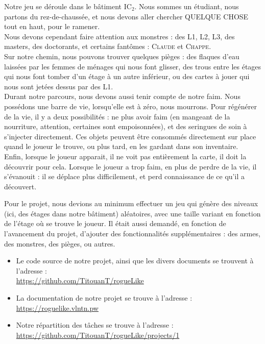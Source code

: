 \documentclass[11pt]{report}
\begin{document}
	Notre jeu se déroule dans le bâtiment IC$_2$. Nous sommes un étudiant, nous partons du rez-de-chaussée, et nous devons aller chercher QUELQUE CHOSE tout en haut, pour le ramener. \\
	Nous devons cependant faire attention aux monstres : des L1, L2, L3, des masters, des doctorants, et certains fantômes : \textsc{Claude} et \textsc{Chappe}.\\
	Sur notre chemin, nous pouvons trouver quelques pièges : des flaques d'eau laissées par les femmes de ménages qui nous font glisser, des trous entre les étages qui nous font tomber d'un étage à un autre inférieur, ou des cartes à jouer qui nous sont jetées dessus par des L1.\\
	Durant notre parcours, nous devons aussi tenir compte de notre faim. Nous possédons une barre de vie, lorsqu'elle est à zéro, nous mourrons. Pour régénérer de la vie, il y a deux possibilités : ne plus avoir faim (en mangeant de la nourriture, attention, certaines sont empoisonnées), et des seringues de soin à s'injecter directement. Ces objets peuvent être consommés directement sur place quand le joueur le trouve, ou plus tard, en les gardant dans son inventaire.\\
	Enfin, lorsque le joueur apparait, il ne voit pas entièrement la carte, il doit la découvrir pour cela. Lorsque le joueur a trop faim, en plus de perdre de la vie, il s'évanouit : il se déplace plus difficilement, et perd connaissance de ce qu'il a découvert.
	
	\vspace{12pt}
	
	Pour le projet, nous devions au minimum effectuer un jeu qui génère des niveaux (ici, des étages dans notre bâtiment) aléatoires, avec une taille variant en fonction de l'étage où se trouve le joueur. Il était aussi demandé, en fonction de l'avancement du projet, d'ajouter des fonctionnalités supplémentaires : des armes, des monstres, des pièges, ou autres.
	
	\vspace{12pt}
	
	\begin{itemize}
	\item Le code source de notre projet, ainsi que les divers documents se trouvent à l'adresse :\\
		\hspace*{1cm} \href{https://github.com/TitouanT/rogueLike}{https://github.com/TitouanT/rogueLike}
	 \item La documentation de notre projet se trouve à l'adresse :\\
	 	\hspace*{1cm} \href{https://roguelike.vlntn.pw}{https://roguelike.vlntn.pw}
	 \item Notre répartition des tâches se trouve à l'adresse :\\
	 	\hspace*{1cm} \href{https://github.com/TitouanT/rogueLike/projects/1}{https://github.com/TitouanT/rogueLike/projects/1}
	\end{itemize}
\end{document}
